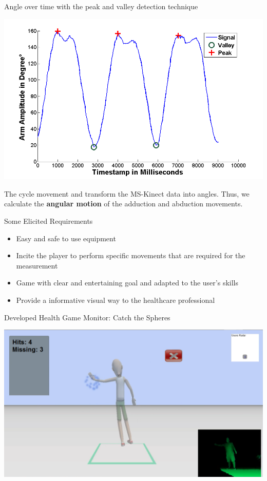 \documentclass{beamer}
\begin{document}
\begin{frame}{Angle over time with the peak and valley detection technique}
  \begin{block}{}
      \center 
      \includegraphics[height=1.6 in]{img/signalamplitudepeakvaley-2.png}
  \end{block}
	
	\begin{block}{}
	The cycle movement and transform the MS-Kinect data into angles. Thus, we calculate the \textbf{angular motion} of the adduction and abduction movements.
	\end{block}
\end{frame}

\begin{frame}{Some Elicited Requirements}
	\begin{block}{}
		\begin{itemize}[<+->]
			\item	Easy and safe to use equipment
      \item Incite the player to perform specific movements that are required for the measurement 
      \item Game with clear and entertaining goal and adapted to the user's skills
			\item Provide a informative visual way to the healthcare professional
		\end{itemize}
	\end{block}
\end{frame}

\begin{frame}{Developed Health Game Monitor: Catch the Spheres}
	\begin{center}
      \center \includegraphics[height=2.2 in]{img/catch_colour.png}
	\end{center}
\end{frame}
\end{document}
